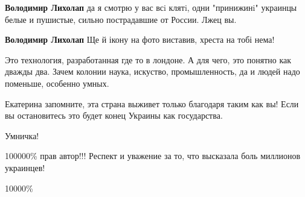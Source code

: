 \begin{itemize}
\begin{itemize}
\textbf{Володимир Лихолап} да я смотрю у вас всi клятi, одни "принижинi" украинцы белые и пушистые, сильно пострадавшие от России.
Лжец вы.

\textbf{Володимир Лихолап} Ще й ікону на фото виставив, хреста на тобі нема!


Это технология, разработанная где то в лондоне. А для чего, это понятно как
дважды два. Зачем колонии наука, искуство, промышленность, да и людей надо
поменьше, особенно умных.

\end{itemize}

Екатерина запомните, эта страна выживет только благодаря таким как вы! Если вы
остановитесь это будет конец Украины как государства.

Умничка!

100000\% прав автор!!! Респект и уважение за то, что высказала боль миллионов
украинцев!

10000\%

\end{itemize}

